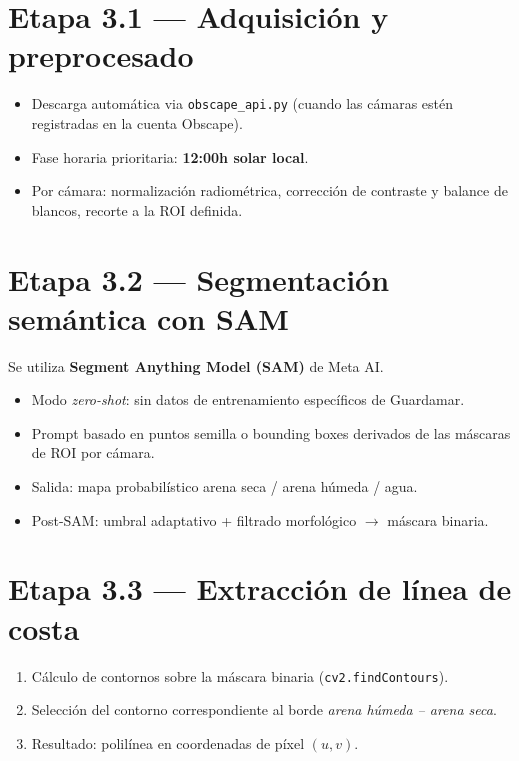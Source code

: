 \section{Etapa 3.1 --- Adquisición y preprocesado}

\begin{itemize}
  \item Descarga automática via \texttt{obscape\_api.py} (cuando las cámaras
        estén registradas en la cuenta Obscape).
  \item Fase horaria prioritaria: \textbf{12:00h solar local}.
  \item Por cámara: normalización radiométrica, corrección de contraste y
        balance de blancos, recorte a la ROI definida.
\end{itemize}

\section{Etapa 3.2 --- Segmentación semántica con SAM}

Se utiliza \textbf{Segment Anything Model (SAM)} de Meta AI.

\begin{itemize}
  \item Modo \emph{zero-shot}: sin datos de entrenamiento específicos
        de Guardamar.
  \item Prompt basado en puntos semilla o bounding boxes derivados de
        las máscaras de ROI por cámara.
  \item Salida: mapa probabilístico arena seca / arena húmeda / agua.
  \item Post-SAM: umbral adaptativo + filtrado morfológico $\to$ máscara
        binaria.
\end{itemize}

\section{Etapa 3.3 --- Extracción de línea de costa}

\begin{enumerate}
  \item Cálculo de contornos sobre la máscara binaria
        (\texttt{cv2.findContours}).
  \item Selección del contorno correspondiente al borde
        \emph{arena húmeda -- arena seca}.
  \item Resultado: polilínea en coordenadas de píxel $(u, v)$.
\end{enumerate}

